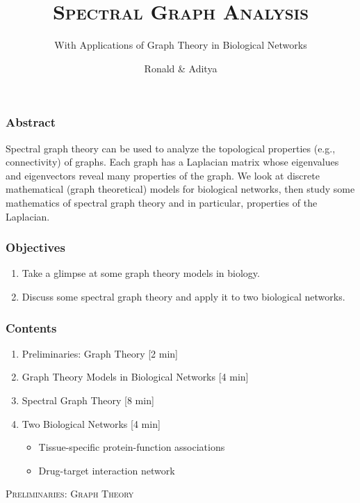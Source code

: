\documentclass[aspectratio=43,leqno]{beamer}
\title{\textsc{Spectral Graph Analysis}}
\subtitle{With Applications of Graph Theory in Biological Networks}
\author{Ronald \& Aditya}
\institute{IISER Mohali}
\begin{document}
\begin{frame}
  \titlepage
\end{frame}

\begin{frame}
  \frametitle{Abstract}
  Spectral graph theory can be used to analyze the topological properties (e.g., connectivity) of graphs. Each graph has a Laplacian matrix whose eigenvalues and eigenvectors reveal many properties of the graph. We look at discrete mathematical (graph theoretical) models for biological networks, then study some mathematics of spectral graph theory and in particular, properties of the Laplacian.
\end{frame}

\begin{frame}
  \frametitle{Objectives}
\begin{enumerate}
\item\label{item:1} Take a glimpse at some graph theory models in biology. \pause
\item\label{item:2} Discuss some spectral graph theory and apply it to two biological networks.
\end{enumerate}
\end{frame}

\begin{frame}
  \frametitle{Contents}
\begin{enumerate}
\item Preliminaries: Graph Theory \hfill [2 min]\pause
\item Graph Theory Models in Biological Networks \hfill [4 min]\pause
\item Spectral Graph Theory \hfill [8 min]\pause
\item Two Biological Networks \hfill [4 min]\pause
\begin{itemize}
\item Tissue-specific protein-function associations 
\item Drug-target interaction network
\end{itemize}
\end{enumerate}
\end{frame}


\begin{frame}
  \vfill
\begin{center}
  \textsc{Preliminaries: Graph Theory}
\end{center}
  \vfill
\end{frame}
\end{document}
